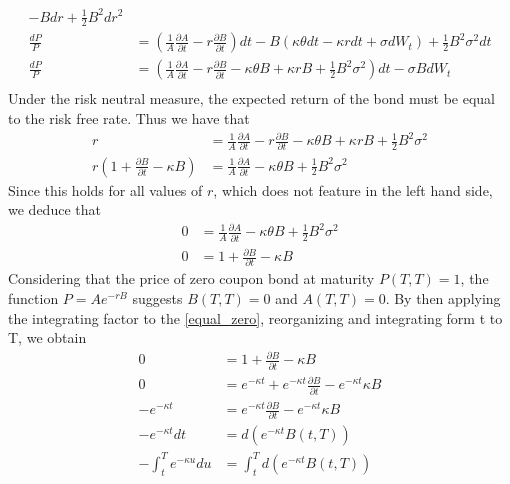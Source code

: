 \begin{appendices}
\begin{align*}
     - B dr + \frac{1}{2} B^2 dr^2 \\
     \frac{dP}{P} &= \left( \frac{1}{A} \frac{\partial A}{\partial t} - r \frac{\partial B}{\partial t} \right) dt
      - B(\kappa \theta dt - \kappa r dt + \sigma dW_t) + \frac{1}{2} B^2 \sigma^2 dt\\
     \frac{dP}{P} &= \left( \frac{1}{A} \frac{\partial A}{\partial t} - r \frac{\partial B}{\partial t} 
     - \kappa \theta B + \kappa r B + \frac{1}{2} B^2 \sigma^2 \right) dt - \sigma B dW_t \\
 \end{align*}
 Under the risk neutral measure, the expected return of the bond must be equal to the risk free rate. Thus we have that
 \begin{align*}
     r  &= \frac{1}{A} \frac{\partial A}{\partial t} - r \frac{\partial B}{\partial t} - \kappa \theta B 
     + \kappa r B + \frac{1}{2} B^2 \sigma^2  \\
     r \left( 1 + \frac{\partial B}{\partial t} - \kappa B \right) & =\frac{1}{A} \frac{\partial A}{\partial t} 
     - \kappa \theta B + \frac{1}{2} B^2 \sigma^2 
 \end{align*}
 Since this holds for all values of $r$, which does not feature in the left hand side, we deduce that
 \begin{align}
     0 &= \frac{1}{A} \frac{\partial A}{\partial t} - \kappa \theta B + \frac{1}{2} B^2 \sigma^2 \label{equal_zero2}\\
     0 &=1 + \frac{\partial B}{\partial t} - \kappa B \label{equal_zero}
 \end{align}
 Considering that the price of zero coupon bond at maturity $P(T,T)=1$, the function $P=A e^{-rB}$ suggests $B(T,T)=0$
 and $A(T,T)=0$. By then applying the integrating factor to the \autoref{equal_zero}, reorganizing and integrating
 form t to T, we obtain
 \begin{align}
    0 &= 1 + \frac{\partial B}{\partial t} - \kappa B \nonumber  \\
    0 &= e^{-\kappa t} + e^{-\kappa t} \frac{\partial B}{\partial t} - e^{-\kappa t} \kappa B \nonumber \\
    -e^{-\kappa t} &= e^{-\kappa t} \frac{\partial B}{\partial t} - e^{-\kappa t} \kappa B  \nonumber \\
    -e^{-\kappa t} dt &= d \left( e^{-\kappa t} B(t, T) \right) \nonumber \\
    - \int_{t}^{T} e^{-\kappa u} du &= \int_{t}^{T} d \left( e^{-\kappa t} B(t, T) \right) \nonumber  \\

\end{align}
\end{appendices}
